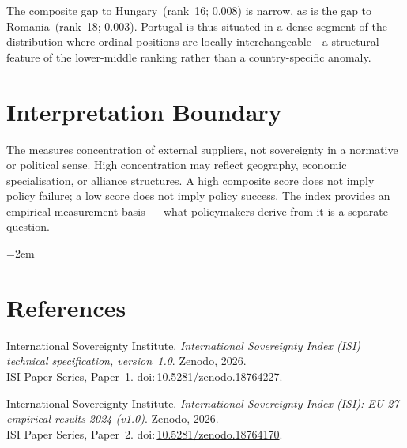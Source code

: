 \documentclass[12pt,a4paper]{article}
\begin{document}
The composite gap to Hungary~(rank~16; 0.008) is narrow, as is the gap to Romania~(rank~18; 0.003).  Portugal is thus situated in a dense segment of the distribution where ordinal positions are locally interchangeable---a structural feature of the lower-middle ranking rather than a country-specific anomaly.


\section{Interpretation Boundary}
\label{sec:interpretation}

The \ISI measures concentration of external suppliers, not sovereignty in a normative or political sense.  High concentration may reflect geography, economic specialisation, or alliance structures.  A high composite score does not imply policy failure; a low score does not imply policy success.  The index provides an empirical measurement basis --- what policymakers derive from it is a separate question.


\clearpage
\vspace*{1.5cm}

\begingroup\emergencystretch=2em
\section*{References}

\begin{enumerate}[label={[\arabic*]},leftmargin=2em,itemsep=6pt]
\item International Sovereignty Institute.
  \textit{International Sovereignty Index (ISI) technical specification, version~1.0}.
  Zenodo, 2026.\\ISI Paper Series, Paper~1.
  doi:\,\href{https://doi.org/10.5281/zenodo.18764227}{10.5281/zenodo.18764227}.

\item International Sovereignty Institute.
  \textit{International Sovereignty Index (ISI): EU-27 empirical results 2024 (v1.0)}.
  Zenodo, 2026.\\ISI Paper Series, Paper~2.
  doi:\,\href{https://doi.org/10.5281/zenodo.18764170}{10.5281/zenodo.18764170}.
\end{enumerate}
\endgroup
\end{document}
